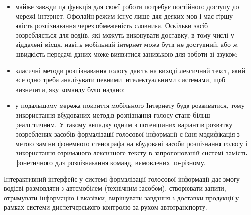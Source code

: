 \begin{itemize}
	\item майже завжди ця функція для своєї роботи потребує постійного доступу до мережі інтернет. Оффлайн режим існує лише для деяких мов і має гіршу якість розпізнавання через обмеженість словника. Оскільки засіб розробляється для водіїв, які можуть виконувати доставку, в тому числі у віддалені місця, навіть мобільний інтернет може бути не доступний, або ж швидкість передачі даних може виявитися занизькою для роботи зі звуком;
	\item класичні методи розпізнавання голосу дають на виході лексичний текст, який все одно треба аналізувати певними інтелектуальними системами, щоб визначити, яку команду було надано;
	\item у подальшому мережа покриття мобільного Інтернету буде розвиватися, тому використання вбудованих методів розпізнання голосу стане більш реалістичним. У такому випадку одним з потенційних варіантів розвитку розроблених засобів формалізації голосової інформації є їхня модифікація з метою заміни фонемного стенографа на вбудовані засоби розпізнання голосу і використання отриманого лексичного тексту в запропонованій системі замість фонетичного для розпізнавання команд, вимовлених по-різному.
\end{itemize}

Інтерактивний інтерфейс у системі формалізації голосової інформації дає змогу водієві розмовляти з автомобілем (технічним засобом), створювати запити, отримувати інформацію і вказівки, вирішувати завдання з доставки продукції у рамках системи диспетчерського контролю за рухом автотранспорту.

